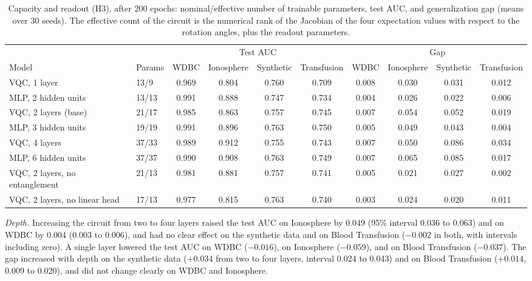 \begin{table}[t]
\centering
\caption{Capacity and readout (H3), after 200 epochs: nominal/effective number of trainable parameters, test AUC, and generalization gap (means over 30 seeds). The effective count of the circuit is the numerical rank of the Jacobian of the four expectation values with respect to the rotation angles, plus the readout parameters.}
\label{tab:h3}
\footnotesize
\setlength{\tabcolsep}{4pt}
\begin{tabular}{llcccccccc}
\hline
 & & \multicolumn{4}{c}{Test AUC} & \multicolumn{4}{c}{Gap} \\
Model & Params & WDBC & Ionosphere & Synthetic & Transfusion & WDBC & Ionosphere & Synthetic & Transfusion \\
\hline
VQC, 1 layer & 13/9 & 0.969 & 0.804 & 0.760 & 0.709 & 0.008 & 0.030 & 0.031 & 0.012 \\
MLP, 2 hidden units & 13/13 & 0.991 & 0.888 & 0.747 & 0.734 & 0.004 & 0.026 & 0.022 & 0.006 \\
VQC, 2 layers (base) & 21/17 & 0.985 & 0.863 & 0.757 & 0.745 & 0.007 & 0.054 & 0.052 & 0.019 \\
MLP, 3 hidden units & 19/19 & 0.991 & 0.896 & 0.763 & 0.750 & 0.005 & 0.049 & 0.043 & 0.004 \\
VQC, 4 layers & 37/33 & 0.989 & 0.912 & 0.755 & 0.743 & 0.007 & 0.050 & 0.086 & 0.034 \\
MLP, 6 hidden units & 37/37 & 0.990 & 0.908 & 0.763 & 0.749 & 0.007 & 0.065 & 0.085 & 0.017 \\
\hline
VQC, 2 layers, no entanglement & 21/13 & 0.981 & 0.881 & 0.757 & 0.741 & 0.005 & 0.021 & 0.027 & 0.002 \\
VQC, 2 layers, no linear head & 17/13 & 0.977 & 0.815 & 0.763 & 0.740 & 0.003 & 0.024 & 0.020 & 0.011 \\
\hline
\end{tabular}
\end{table}

\textit{Depth.} Increasing the circuit from two to four layers raised the test AUC on Ionosphere by 0.049 (95\% interval 0.036 to 0.063) and on WDBC by 0.004 (0.003 to 0.006), and had no clear effect on the synthetic data and on Blood Transfusion ($-0.002$ in both, with intervals including zero). A single layer lowered the test AUC on WDBC ($-0.016$), on Ionosphere ($-0.059$), and on Blood Transfusion ($-0.037$). The gap increased with depth on the synthetic data ($+0.034$ from two to four layers, interval 0.024 to 0.043) and on Blood Transfusion ($+0.014$, 0.009 to 0.020), and did not change clearly on WDBC and Ionosphere.


